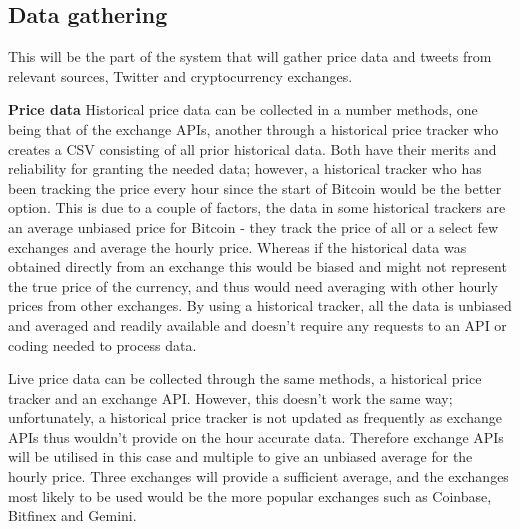 \documentclass[oneside, 12pt]{article}
\begin{document}
		\subsection{Data gathering}
		This will be the part of the system that will gather price data and tweets from relevant sources, Twitter and cryptocurrency exchanges.
		\newline
		
		\textbf{Price data}
		\newline
		\newline
		Historical price data can be collected in a number methods, one being that of the exchange APIs, another through a historical price tracker who creates a CSV consisting of all prior historical data. Both have their merits and reliability for granting the needed data; however, a historical tracker who has been tracking the price every hour since the start of Bitcoin would be the better option. This is due to a couple of factors, the data in some historical trackers are an average unbiased price for Bitcoin - they track the price of all or a select few exchanges and average the hourly price. Whereas if the historical data was obtained directly from an exchange this would be biased and might not represent the true price of the currency, and thus would need averaging with other hourly prices from other exchanges. By using a historical tracker, all the data is unbiased and averaged and readily available and doesn't require any requests to an API or coding needed to process data.
		
		Live price data can be collected through the same methods, a historical price tracker and an exchange API. However, this doesn't work the same way; unfortunately, a historical price tracker is not updated as frequently as exchange APIs thus wouldn't provide on the hour accurate data. Therefore exchange APIs will be utilised in this case and multiple to give an unbiased average for the hourly price. Three exchanges will provide a sufficient average, and the exchanges most likely to be used would be the more popular exchanges such as Coinbase, Bitfinex and Gemini.
		\newline
		
\end{document}
